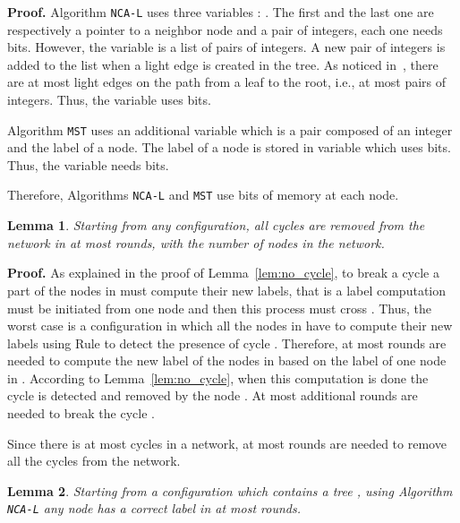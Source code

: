 \documentclass[11pt,a4paper]{article}
\newtheorem{lemma}{Lemma}
\newenvironment{proof}{\noindent \begin{rm}{\textbf{Proof.} }}{\hspace*{\fill}\par\end{rm}}
\newcommand{\MST}{\mbox{\tt MST}}
\newcommand{\LabA}{\mbox{\tt NCA-L}}
\begin{document}
\begin{proof}
Algorithm \LabA\/ uses three variables : . The first and the last one are respectively a pointer to 
a neighbor node and a pair of integers, each one needs 
bits. However, the variable  is a list 
of pairs of integers. A new pair of integers is added to the list when
a light edge is created in the tree. 
As noticed in~\cite{AGKR02}, there are at most  light edges on
the path from a leaf to the root, i.e., 
at most  pairs of integers. Thus, the variable  uses  bits.

Algorithm \MST\/ uses an additional variable  which is a pair
composed of an integer and the label of a node. 
The label of a node is stored in variable  which uses  bits. Thus, the variable  needs  bits.

Therefore, Algorithms \LabA\/ and \MST\/ use  bits of memory at each node.
\end{proof}

\begin{lemma}
\label{lem:no_cycle_complexity}
Starting from any configuration, all cycles are removed from the network in at most  rounds, with  the number of nodes in the network.
\end{lemma}

\begin{proof}
As explained in the proof of Lemma~\ref{lem:no_cycle}, to break a cycle  a part of the nodes in  must compute their new labels, that is a label computation must be initiated from one node and then this process must cross . Thus, the worst case is a configuration in which all the nodes in  have to compute their new labels using Rule  to detect the presence of cycle . Therefore, at most  rounds are needed to compute the new label of the nodes in  based on the label of one node  in . According to Lemma~\ref{lem:no_cycle}, when this computation is done the cycle  is detected and removed by the node . At most  additional rounds are needed to break the cycle .

Since there is at most  cycles in a network, at most  rounds are needed to remove all the cycles from the network.
\end{proof}

\begin{lemma}
\label{lem:label_complexity}
Starting from a configuration which contains a tree , using Algorithm \LabA\/ any node  has a correct label in at most  rounds.
\end{lemma}
\end{document}
